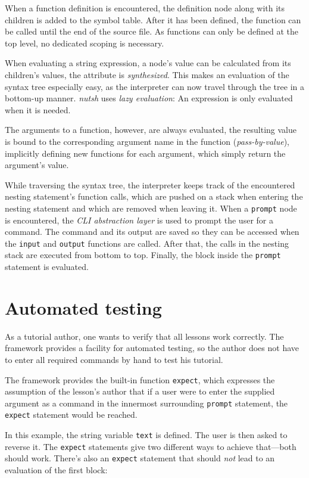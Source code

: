 \documentclass[paper=a4,twoside,abstract=on,cleardoublepage=empty,numbers=noenddot,toc=bib,12pt,appendixprefix=true]{scrreprt}
\begin{document}
When a function definition is encountered, the definition node along with its children is added to the symbol table. After it has been defined, the function can be called until the end of the source file. As functions can only be defined at the top level, no dedicated scoping is necessary.

When evaluating a string expression, a node's value can be calculated from its children's values, the attribute is \emph{synthesized}. This makes an evaluation of the syntax tree especially easy, as the interpreter can now travel through the tree in a bottom-up manner. \emph{nutsh} uses \emph{lazy evaluation}: An expression is only evaluated when it is needed.

The arguments to a function, however, are always evaluated, the resulting value is bound to the corresponding argument name in the function (\emph{pass-by-value}), implicitly defining new functions for each argument, which simply return the argument's value.

While traversing the syntax tree, the interpreter keeps track of the encountered nesting statement's function calls, which are pushed on a stack when entering the nesting statement and which are removed when leaving it. When a \texttt{prompt} node is encountered, the \emph{CLI abstraction layer} is used to prompt the user for a command. The command and its output are saved so they can be accessed when the \texttt{input} and \texttt{output} functions are called. After that, the calls in the nesting stack are executed from bottom to top. Finally, the block inside the \texttt{prompt} statement is evaluated.

\section{Automated testing}
\label{sec:testing}

As a tutorial author, one wants to verify that all lessons work correctly. The framework provides a facility for automated testing, so the author does not have to enter all required commands by hand to test his tutorial.

The framework provides the built-in function \texttt{expect}, which expresses the assumption of the lesson's author that if a user were to enter the supplied argument as a command in the innermost surrounding \texttt{prompt} statement, the \texttt{expect} statement would be reached.

In this example, the string variable \texttt{text} is defined. The user is then asked to reverse it. The \texttt{expect} statements give two different ways to achieve that---both should work. There's also an \texttt{expect} statement that should \emph{not} lead to an evaluation of the first block:
\end{document}
